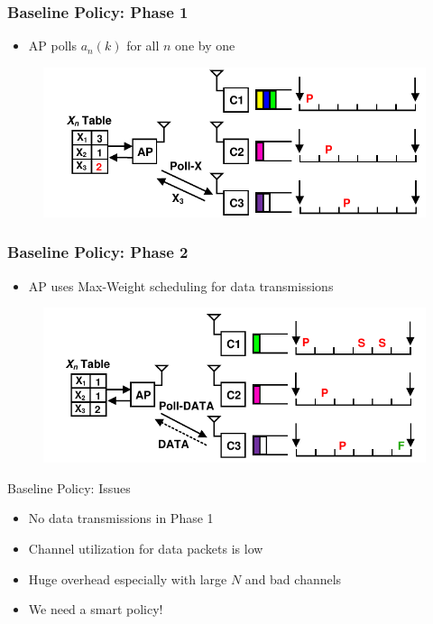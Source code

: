 \documentclass{beamer}
\begin{document}
\begin{frame}
\frametitle{Baseline Policy: Phase 1}
\begin{itemize}
\item AP polls $a_n(k)$ for all $n$ one by one
\end{itemize}
\begin{figure}
\centering
\includegraphics[scale=0.8]{animation_03.pdf}
\end{figure}
\end{frame}

\begin{frame}
\frametitle{Baseline Policy: Phase 2}
\begin{itemize}
\item AP uses Max-Weight scheduling for data transmissions
\end{itemize}
\begin{figure}
\centering
\includegraphics[scale=0.8]{animation_06.pdf}
\end{figure}
\end{frame}

\begin{frame}{Baseline Policy: Issues}
  \begin{itemize}
    \item No data transmissions in Phase 1
    \item Channel utilization for data packets is low
    \item Huge overhead especially with large $N$ and bad channels
    \item We need a smart policy!
  \end{itemize}
\end{frame}
\end{document}
